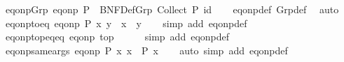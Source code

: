 \begin{isabellebody}
\isanewline
{}\isamarkupfalse%
\ eq{\isacharunderscore}{\kern0pt}onp{\isacharunderscore}{\kern0pt}Grp{\isacharcolon}{\kern0pt}\ {\isachardoublequoteopen}eq{\isacharunderscore}{\kern0pt}onp\ P\ {\isacharequal}{\kern0pt}\ BNF{\isacharunderscore}{\kern0pt}Def{\isachardot}{\kern0pt}Grp\ {\isacharparenleft}{\kern0pt}Collect\ P{\isacharparenright}{\kern0pt}\ id{\isachardoublequoteclose}\isanewline
%
\isadelimproof
\ \ %
\endisadelimproof
%
\isatagproof
{}\isamarkupfalse%
\ eq{\isacharunderscore}{\kern0pt}onp{\isacharunderscore}{\kern0pt}def\ Grp{\isacharunderscore}{\kern0pt}def\ \isamarkupfalse%
\ auto%
\endisatagproof
{\isafoldproof}%
%
\isadelimproof
\isanewline
%
\endisadelimproof
\isanewline
{}\isamarkupfalse%
\ eq{\isacharunderscore}{\kern0pt}onp{\isacharunderscore}{\kern0pt}to{\isacharunderscore}{\kern0pt}eq{\isacharcolon}{\kern0pt}\ {\isachardoublequoteopen}eq{\isacharunderscore}{\kern0pt}onp\ P\ x\ y\ {\isasymLongrightarrow}\ x\ {\isacharequal}{\kern0pt}\ y{\isachardoublequoteclose}\isanewline
%
\isadelimproof
\ \ %
\endisadelimproof
%
\isatagproof
{}\isamarkupfalse%
\ {\isacharparenleft}{\kern0pt}simp\ add{\isacharcolon}{\kern0pt}\ eq{\isacharunderscore}{\kern0pt}onp{\isacharunderscore}{\kern0pt}def{\isacharparenright}{\kern0pt}%
\endisatagproof
{\isafoldproof}%
%
\isadelimproof
\isanewline
%
\endisadelimproof
\isanewline
{}\isamarkupfalse%
\ eq{\isacharunderscore}{\kern0pt}onp{\isacharunderscore}{\kern0pt}top{\isacharunderscore}{\kern0pt}eq{\isacharunderscore}{\kern0pt}eq{\isacharcolon}{\kern0pt}\ {\isachardoublequoteopen}eq{\isacharunderscore}{\kern0pt}onp\ top\ {\isacharequal}{\kern0pt}\ {\isacharparenleft}{\kern0pt}{\isacharequal}{\kern0pt}{\isacharparenright}{\kern0pt}{\isachardoublequoteclose}\isanewline
%
\isadelimproof
\ \ %
\endisadelimproof
%
\isatagproof
{}\isamarkupfalse%
\ {\isacharparenleft}{\kern0pt}simp\ add{\isacharcolon}{\kern0pt}\ eq{\isacharunderscore}{\kern0pt}onp{\isacharunderscore}{\kern0pt}def{\isacharparenright}{\kern0pt}%
\endisatagproof
{\isafoldproof}%
%
\isadelimproof
\isanewline
%
\endisadelimproof
\isanewline
{}\isamarkupfalse%
\ eq{\isacharunderscore}{\kern0pt}onp{\isacharunderscore}{\kern0pt}same{\isacharunderscore}{\kern0pt}args{\isacharcolon}{\kern0pt}\ {\isachardoublequoteopen}eq{\isacharunderscore}{\kern0pt}onp\ P\ x\ x\ {\isacharequal}{\kern0pt}\ P\ x{\isachardoublequoteclose}\isanewline
%
\isadelimproof
\ \ %
\endisadelimproof
%
\isatagproof
{}\isamarkupfalse%
\ {\isacharparenleft}{\kern0pt}auto\ simp\ add{\isacharcolon}{\kern0pt}\ eq{\isacharunderscore}{\kern0pt}onp{\isacharunderscore}{\kern0pt}def{\isacharparenright}{\kern0pt}%

\end{isabellebody}
